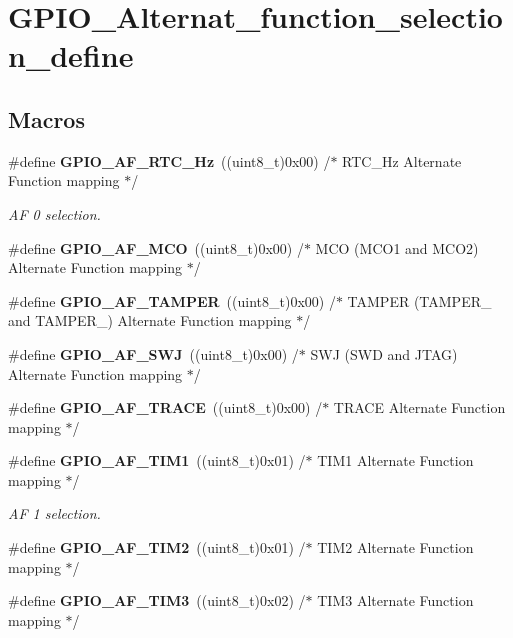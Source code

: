 \section{G\+P\+I\+O\+\_\+\+Alternat\+\_\+function\+\_\+selection\+\_\+define}
\label{group__GPIO__Alternat__function__selection__define}
\subsection*{Macros}
\begin{DoxyCompactItemize}
\item 
\#define \textbf{ G\+P\+I\+O\+\_\+\+A\+F\+\_\+\+R\+T\+C\+\_\+Hz}~((uint8\+\_\+t)0x00)  /$\ast$ R\+T\+C\+\_\+Hz Alternate Function mapping $\ast$/
\begin{DoxyCompactList}\small\item\em AF 0 selection. \end{DoxyCompactList}\item 
\#define \textbf{ G\+P\+I\+O\+\_\+\+A\+F\+\_\+\+M\+CO}~((uint8\+\_\+t)0x00)  /$\ast$ M\+C\+O (\+M\+C\+O1 and M\+C\+O2) Alternate Function mapping $\ast$/
\item 
\#define \textbf{ G\+P\+I\+O\+\_\+\+A\+F\+\_\+\+T\+A\+M\+P\+ER}~((uint8\+\_\+t)0x00)  /$\ast$ T\+A\+M\+P\+E\+R (\+T\+A\+M\+P\+E\+R\+\_ and T\+A\+M\+P\+E\+R\+\_) Alternate Function mapping $\ast$/
\item 
\#define \textbf{ G\+P\+I\+O\+\_\+\+A\+F\+\_\+\+S\+WJ}~((uint8\+\_\+t)0x00)  /$\ast$ S\+W\+J (\+S\+W\+D and J\+T\+A\+G) Alternate Function mapping $\ast$/
\item 
\#define \textbf{ G\+P\+I\+O\+\_\+\+A\+F\+\_\+\+T\+R\+A\+CE}~((uint8\+\_\+t)0x00)  /$\ast$ T\+R\+A\+C\+E Alternate Function mapping $\ast$/
\item 
\#define \textbf{ G\+P\+I\+O\+\_\+\+A\+F\+\_\+\+T\+I\+M1}~((uint8\+\_\+t)0x01)  /$\ast$ T\+I\+M1 Alternate Function mapping $\ast$/
\begin{DoxyCompactList}\small\item\em AF 1 selection. \end{DoxyCompactList}\item 
\#define \textbf{ G\+P\+I\+O\+\_\+\+A\+F\+\_\+\+T\+I\+M2}~((uint8\+\_\+t)0x01)  /$\ast$ T\+I\+M2 Alternate Function mapping $\ast$/
\item 
\#define \textbf{ G\+P\+I\+O\+\_\+\+A\+F\+\_\+\+T\+I\+M3}~((uint8\+\_\+t)0x02)  /$\ast$ T\+I\+M3 Alternate Function mapping $\ast$/

\end{DoxyCompactItemize}
